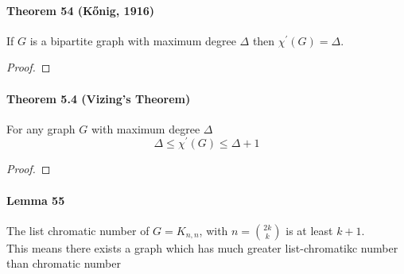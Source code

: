 \paragraph{Theorem 54 (K\H{o}nig, 1916)} If $ G $ is a bipartite graph
with maximum degree $\Delta$ then $\chi^\prime(G) = \Delta$.
\begin{proof}
    {\color{red}{TODO}}
\end{proof}

\paragraph{Theorem 5.4 (Vizing's Theorem)}
For any graph $ G $ with maximum degree $\Delta$
$$ \Delta \leq \chi^\prime(G) \leq \Delta + 1 $$
\begin{proof}
    {\color{red}{TODO}}
\end{proof}

\paragraph{Lemma 55} 
The list chromatic number of $ G = K_{n,n} $, with $n = \binom{2k}{k}$ 
is at least $k+1$.
\\
This means there exists a graph which has much greater list-chromatikc 
number than chromatic number
